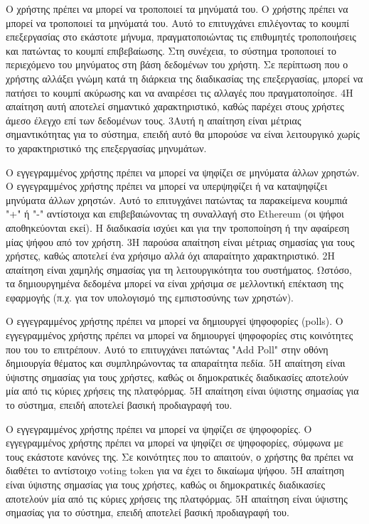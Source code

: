 \begin{enumerate}[label=\textbf{<ΛΑ-\arabic*>}, leftmargin=\parindent, align=left, labelwidth=\parindent, labelsep=0pt]
	\sysReqItem
		{\label{srs:functional-srs-modify-post}}
		{Ο χρήστης πρέπει να μπορεί να τροποποιεί τα μηνύματά του.}
		{Ο χρήστης πρέπει να μπορεί να τροποποιεί τα μηνύματά του. Αυτό το επιτυγχάνει επιλέγοντας το κουμπί επεξεργασίας στο εκάστοτε μήνυμα, πραγματοποιώντας τις επιθυμητές τροποποιήσεις και πατώντας το κουμπί επιβεβαίωσης. Στη συνέχεια, το σύστημα τροποποιεί το περιεχόμενο του μηνύματος στη βάση δεδομένων του χρήστη. Σε περίπτωση που ο χρήστης αλλάξει γνώμη κατά τη διάρκεια της διαδικασίας της επεξεργασίας, μπορεί να πατήσει το κουμπί ακύρωσης και να αναιρέσει τις αλλαγές που πραγματοποίησε.}
		{4}{Η απαίτηση αυτή αποτελεί σημαντικό χαρακτηριστικό, καθώς παρέχει στους χρήστες άμεσο έλεγχο επί των δεδομένων τους.}
		{3}{Αυτή η απαίτηση είναι μέτριας σημαντικότητας για το σύστημα, επειδή αυτό θα μπορούσε να είναι λειτουργικό χωρίς το χαρακτηριστικό της επεξεργασίας μηνυμάτων.}

	\sysReqItem
		{\label{srs:functional-srs-vote-posts}}
		{Ο εγγεγραμμένος χρήστης πρέπει να μπορεί να ψηφίζει σε μηνύματα άλλων χρηστών.}
		{Ο εγγεγραμμένος χρήστης πρέπει να μπορεί να υπερψηφίζει ή να καταψηφίζει μηνύματα άλλων χρηστών. Αυτό το επιτυγχάνει πατώντας τα παρακείμενα κουμπιά "+" ή "-" αντίστοιχα και επιβεβαιώνοντας τη συναλλαγή στο Ethereum (οι ψήφοι αποθηκεύονται εκεί). Η διαδικασία ισχύει και για την τροποποίηση ή την αφαίρεση μίας ψήφου από τον χρήστη.}
		{3}{Η παρούσα απαίτηση είναι μέτριας σημασίας για τους χρήστες, καθώς αποτελεί ένα χρήσιμο αλλά όχι απαραίτητο χαρακτηριστικό.}
		{2}{Η απαίτηση είναι χαμηλής σημασίας για τη λειτουργικότητα του συστήματος. Ωστόσο, τα δημιουργημένα δεδομένα μπορεί να είναι χρήσιμα σε μελλοντική επέκταση της εφαρμογής (π.χ. για τον υπολογισμό της εμπιστοσύνης των χρηστών).}

	\sysReqItem
		{\label{srs:functional-srs-create-polls}}
		{Ο εγγεγραμμένος χρήστης πρέπει να μπορεί να δημιουργεί ψηφοφορίες (polls).}
		{Ο εγγεγραμμένος χρήστης πρέπει να μπορεί να δημιουργεί ψηφοφορίες στις κοινότητες που του το επιτρέπουν. Αυτό το επιτυγχάνει πατώντας "Add Poll" στην οθόνη δημιουργία θέματος και συμπληρώνοντας τα απαραίτητα πεδία.}
		{5}{Η απαίτηση είναι ύψιστης σημασίας για τους χρήστες, καθώς οι δημοκρατικές διαδικασίες αποτελούν μία από τις κύριες χρήσεις της πλατφόρμας.}
		{5}{Η απαίτηση είναι ύψιστης σημασίας για το σύστημα, επειδή αποτελεί βασική προδιαγραφή του.}

	\sysReqItem
		{\label{srs:functional-srs-vote-polls}}
		{Ο εγγεγραμμένος χρήστης πρέπει να μπορεί να ψηφίζει σε ψηφοφορίες.}
		{Ο εγγεγραμμένος χρήστης πρέπει να μπορεί να ψηφίζει σε ψηφοφορίες, σύμφωνα με τους εκάστοτε κανόνες της. Σε κοινότητες που το απαιτούν, ο χρήστης θα πρέπει να διαθέτει το αντίστοιχο voting token για να έχει το δικαίωμα ψήφου.}
		{5}{Η απαίτηση είναι ύψιστης σημασίας για τους χρήστες, καθώς οι δημοκρατικές διαδικασίες αποτελούν μία από τις κύριες χρήσεις της πλατφόρμας.}
		{5}{Η απαίτηση είναι ύψιστης σημασίας για το σύστημα, επειδή αποτελεί βασική προδιαγραφή του.}


\end{enumerate}
